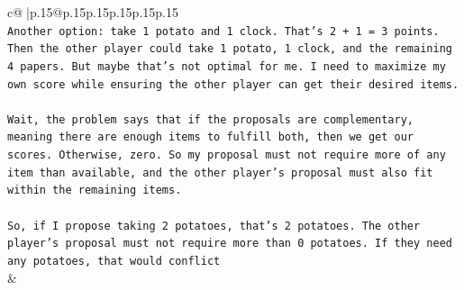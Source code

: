 \documentclass{article}
\begin{document}
{\begin{supertabular}{c@{$\;$}|p{.15\linewidth}@{}p{.15\linewidth}p{.15\linewidth}p{.15\linewidth}p{.15\linewidth}p{.15\linewidth}}
{{{\\ 
\texttt{Another option: take 1 potato and 1 clock. That's 2 + 1 = 3 points. Then the other player could take 1 potato, 1 clock, and the remaining 4 papers. But maybe that's not optimal for me. I need to maximize my own score while ensuring the other player can get their desired items.} \\
\\ 
\texttt{Wait, the problem says that if the proposals are complementary, meaning there are enough items to fulfill both, then we get our scores. Otherwise, zero. So my proposal must not require more of any item than available, and the other player's proposal must also fit within the remaining items.} \\
\\ 
\texttt{So, if I propose taking 2 potatoes, that's 2 potatoes. The other player's proposal must not require more than 0 potatoes. If they need any potatoes, that would conflict} \\
            }
        }
    }
    & \\ \\


\end{supertabular}}
\end{document}

